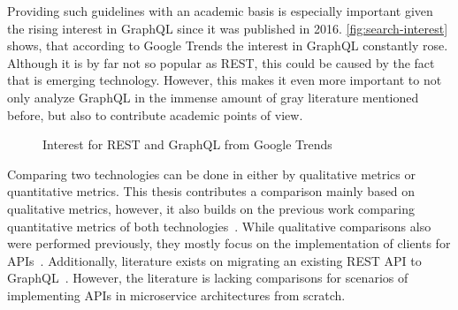 
Providing such guidelines with an academic basis is especially important given the rising interest in GraphQL since it was published in 2016.
\autoref{fig:search-interest} shows, that according to Google Trends the interest in GraphQL constantly rose.
Although it is by far not so popular as \ac{REST}, this could be caused by the fact that is emerging technology.
However, this makes it even more important to not only analyze GraphQL in the immense amount of gray literature mentioned before, but also to contribute academic points of view.

\begin{figure}[h!]
    \centering
    \caption{Interest for \acs{REST} and GraphQL from Google Trends}\label{fig:search-interest}    
\end{figure}

Comparing two technologies can be done in either by qualitative metrics or quantitative metrics.
This thesis contributes a comparison mainly based on qualitative metrics, however, it also builds on the previous work comparing quantitative metrics of both technologies~\cite{Brito2019,Brito2020,Wittern2018,Seabra2019}.
While qualitative comparisons also were performed previously, they mostly focus on the implementation of clients for \acp{API}~\cite{Brito2020}.
Additionally, literature exists on migrating an existing \ac{REST} \ac{API} to GraphQL~\cite{Vogel2017, Lama2019, Wittern2018}.
However, the literature is lacking comparisons for scenarios of implementing \acp{API} in microservice architectures from scratch.

